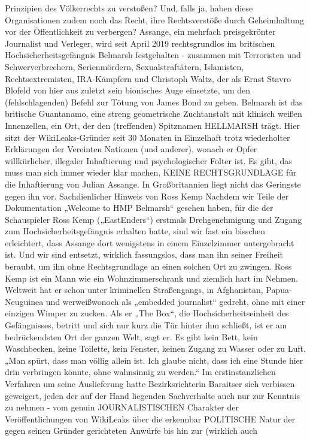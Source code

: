 \begin{multicols}{2}
Prinzipien des Völkerrechts zu verstoßen? Und, falls ja,
haben diese Organisationen zudem noch das Recht, ihre
Rechtsverstöße durch Geheimhaltung vor der Öffentlichkeit zu verbergen?
Assange, ein mehrfach preisgekrönter Journalist und
Verleger, wird seit April 2019 rechtsgrundlos im britischen Hochsicherheitsgefängnis Belmarsh festgehalten
- zusammen mit Terroristen und Schwerverbrechern,
Serienmördern, Sexualstraftätern, Islamisten, Rechtsextremisten, IRA-Kämpfern und Christoph Waltz, der
als Ernst Stavro Blofeld von hier aus zuletzt sein bionisches Auge einsetzte, um den (fehlschlagenden) Befehl
zur Tötung von James Bond zu geben. Belmarsh ist das
britische Guantanamo, eine streng geometrische Zuchtanstalt mit klinisch weißen Innenzellen, ein Ort, der den
(treffenden) Spitznamen HELLMARSH trägt. Hier sitzt
der WikiLeaks-Gründer seit 30 Monaten in Einzelhaft trotz wiederholter Erklärungen der Vereinten Nationen
(und anderer), wonach er Opfer willkürlicher, illegaler Inhaftierung und psychologischer Folter ist. Es gibt,
das muss man sich immer wieder klar machen, KEINE
RECHTSGRUNDLAGE für die Inhaftierung von Julian
Assange. In Großbritannien liegt nicht das Geringste
gegen ihn vor.
Sachdienlicher Hinweis von Ross Kemp
Nachdem wir Teile der Dokumentation „Welcome to
HMP Belmarsh“ gesehen haben, für die der Schauspieler
Ross Kemp („EastEnders“) erstmals Drehgenehmigung
und Zugang zum Hochsicherheitsgefängnis erhalten hatte, sind wir fast ein bisschen erleichtert, dass Assange dort
wenigstens in einem Einzelzimmer untergebracht ist.
Und wir sind entsetzt, wirklich fassungslos, dass man ihn
seiner Freiheit beraubt, um ihn ohne Rechtsgrundlage an
einen solchen Ort zu zwingen. Ross Kemp ist ein Mann wie
ein Wohnzimmerschrank und ziemlich hart im Nehmen.
Weltweit hat er schon unter kriminellen Straßengangs, in
Afghanistan, Papua-Neuguinea und werweißwonoch als
„embedded journalist“ gedreht, ohne mit einer einzigen
Wimper zu zucken. Als er „The Box“, die Hochsicherheitseinheit des Gefängnisses, betritt und sich nur kurz die
Tür hinter ihm schließt, ist er am bedrückendsten Ort der
ganzen Welt, sagt er. Es gibt kein Bett, kein Waschbecken,
keine Toilette, kein Fenster, keinen Zugang zu Wasser oder
zu Luft. „Man spürt, dass man völlig allein ist. Ich glaube
nicht, dass ich eine Stunde hier drin verbringen könnte,
ohne wahnsinnig zu werden.“
Im erstinstanzlichen Verfahren um seine Auslieferung
hatte Bezirksrichterin Baraitser sich verbissen geweigert,
jeden der auf der Hand liegenden Sachverhalte auch nur
zur Kenntnis zu nehmen - vom genuin JOURNALISTISCHEN Charakter der Veröffentlichungen von WikiLeaks
über die erkennbar POLITISCHE Natur der gegen seinen
Gründer gerichteten Anwürfe bis hin zur (wirklich auch


\end{multicols}
